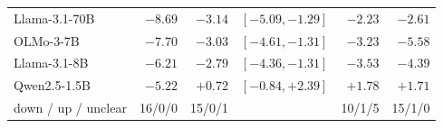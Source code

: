 \begin{table}[tb]
\begin{tabular}{lrrrrr}
Llama-3.1-70B & $\mathbf{-8.69}$ & $\mathbf{-3.14}$ & $[-5.09,-1.29]$ & $\mathbf{-2.23}$ & $\mathbf{-2.61}$ \\
OLMo-3-7B & $\mathbf{-7.70}$ & $\mathbf{-3.03}$ & $[-4.61,-1.31]$ & $\mathbf{-3.23}$ & $\mathbf{-5.58}$ \\
Llama-3.1-8B & $\mathbf{-6.21}$ & $\mathbf{-2.79}$ & $[-4.36,-1.31]$ & $\mathbf{-3.53}$ & $\mathbf{-4.39}$ \\
Qwen2.5-1.5B & $\mathbf{-5.22}$ & $+0.72$ & $[-0.84,+2.39]$ & $\mathbf{+1.78}$ & $\mathbf{+1.71}$ \\
\midrule down / up / unclear & 16/0/0 & 15/0/1 & & 10/1/5 & 15/1/0 \\
\bottomrule\end{tabular}\end{table}
